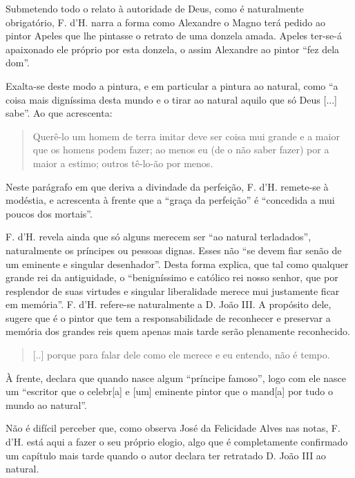 \documentclass{article}
\begin{document}
Submetendo todo o relato à autoridade de Deus, como é naturalmente
obrigatório, F. d'H. narra a forma como Alexandre o Magno terá pedido
ao pintor Apeles que lhe pintasse o retrato de uma donzela
amada. Apeles ter-se-á apaixonado ele próprio por esta donzela, o
assim Alexandre ao pintor ``fez dela dom''\cite[p.13]{holanda}.

Exalta-se deste modo a pintura, e em particular a pintura ao natural,
como ``a coisa mais digníssima desta mundo e o tirar ao natural aquilo
que só Deus [...] sabe''. Ao que acrescenta:\cite[p.13]{holanda}

\begin{quote}
   Querê-lo um homem de terra imitar deve ser coisa mui grande e a
   maior que os homens podem fazer; ao menos eu (de o não saber fazer)
   por a maior a estimo; outros tê-lo-ão por menos.
\end{quote}

Neste parágrafo em que deriva a divindade da perfeição,
F. d'H. remete-se à modéstia, e acrescenta à frente que a ``graça da
perfeição'' é ``concedida a mui poucos dos
mortais''\cite[p.14]{holanda}.

F. d'H. revela ainda que só alguns merecem ser ``ao natural
terladados'', naturalmente os príncipes ou pessoas dignas. Esses não
``se devem fiar senão de um eminente e singular desenhador''. Desta
forma explica, que tal como qualquer grande rei da antiguidade, o
``benigníssimo e católico rei nosso senhor, que por resplendor de suas
virtudes e singular liberalidade merece mui justamente ficar em
memória''\cite[p.15]{holanda}. F. d'H. refere-se naturalmente a
D. João III. A propósito dele, sugere que é o pintor que tem a
responsabilidade de reconhecer e preservar a memória dos grandes reis
quem apenas mais tarde serão plenamente reconhecido.

\begin{quote}
  [..] porque para falar dele como ele merece e eu entendo, não é tempo.
\end{quote}\cite[p.15]{holanda}

À frente, declara que quando nasce algum ``príncipe famoso'', logo com
ele nasce um ``escritor que o celebr[a] e [um] eminente pintor que o
mand[a] por tudo o mundo ao natural''.

Não é difícil perceber que, como observa José da Felicidade Alves nas
notas\cite[p.47]{holanda}, F. d'H. está aqui a fazer o seu próprio
elogio, algo que é completamente confirmado um capítulo mais tarde
quando o autor declara ter retratado D. João III ao natural.
\end{document}
